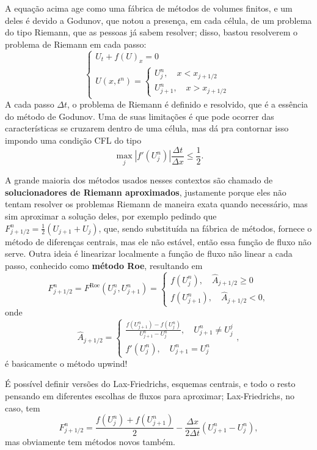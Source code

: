 \documentclass[../differential_methods.tex]{subfiles}
\begin{document}
A equação acima age como uma fábrica de métodos de volumes finitos, e um deles é devido a Godunov, que notou a presença, em cada célula, de um problema do tipo Riemann, que as pessoas já sabem resolver; disso, bastou resolverem o problema de Riemann em cada passo:
\[
	\left\{\begin{array}{ll}
		U_t + f(U)_x = 0 \\
		U(x, t^{n}) = \left\{\begin{array}{ll}
			                     U_{j}^{n}, \quad x < x_{j+1/2} \\
			                     U_{j+1}^{n}, \quad x > x_{j+1/2}
		                     \end{array}\right.
	\end{array}\right.
\]
A cada passo \(\Delta t\), o problema de Riemann é definido e resolvido, que é a essência do método de Godunov. Uma de suas limitações é que pode ocorrer das características se cruzarem dentro de uma célula, mas dá pra contornar isso impondo uma condição CFL do tipo
\[
	\max\limits_{j}| f'(U_{j}^{n}) |\frac{\Delta t}{\Delta x}\leq \frac{1}{2}.
\]

A grande maioria dos métodos usados nesses contextos são chamado de \textbf{solucionadores de Riemann aproximados}, justamente porque eles não tentam resolver os problemas Riemann de maneira exata quando necessário, mas sim aproximar a solução deles, por exemplo pedindo que \(F_{j+1/2}^{n} = \frac{1}{2}(U_{j+1}+U_{j})\), que, sendo substituída na fábrica de métodos, fornece o método de diferenças centrais, mas ele não estável, então essa função de fluxo não serve.
Outra ideia é linearizar localmente a função de fluxo não linear a cada passo, conhecido como \textbf{método Roe}, resultando em
\[
	F_{j+1/2}^{n} = F^{\mathrm{Roe}}(U_{j}^{n}, U_{j+1}^{n}) = \left\{\begin{array}{ll}
		f(U_{j}^{n}), \quad \hat{A}_{j+1/2}\geq 0 \\
		f(U_{j+1}^{n}), \quad \hat{A}_{j+1/2}<0,
	\end{array}\right.
\]
onde
\[
	\hat{A}_{j+1/2}  = \left\{\begin{array}{ll}
		\frac{f(U_{j+1}^{n})-f(U_{j}^{n})}{U_{j+1}^{n}-U_{j}^{n}}, \quad U_{j+1}^{n}\neq U_{j}^{j} \\
		f'(U_{j}^{n}), \quad U_{j+1}^{n}=U_{j}^{n}
	\end{array}\right.,
\]
é basicamente o método upwind!

É possível definir versões do Lax-Friedrichs, esquemas centrais, e todo o resto pensando em diferentes escolhas de fluxos para aproximar; Lax-Friedrichs, no caso, tem
\[
	F_{j+1/2}^{n} = \frac{f(U_{j}^{n})+f(U_{j+1}^{n})}{2}-\frac{\Delta x}{2\Delta t}(U_{j+1}^{n}-U_{j}^{n}),
\]
mas obviamente tem métodos novos também.
\end{document}
